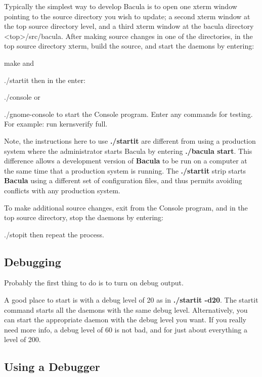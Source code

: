 Typically the simplest way to develop Bacula is to open one xterm window
pointing to the source directory you wish to update; a second xterm window at
the top source directory level, and a third xterm window at the bacula
directory {\textless}top{\textgreater}/src/bacula. After making source changes in one of the
directories, in the top source directory xterm, build the source, and start
the daemons by entering:

make and

./startit then in the enter:

./console or

./gnome-console to start the Console program. Enter any commands for testing.
For example: run kernsverify full.

Note, the instructions here to use {\bf ./startit} are different from using a
production system where the administrator starts Bacula by entering {\bf
./bacula start}. This difference allows a development version of {\bf Bacula}
to be run on a computer at the same time that a production system is running.
The {\bf ./startit} strip starts {\bf Bacula} using a different set of
configuration files, and thus permits avoiding conflicts with any production
system.

To make additional source changes, exit from the Console program, and in the
top source directory, stop the daemons by entering:

./stopit then repeat the process.

\subsection{Debugging}

Probably the first thing to do is to turn on debug output.

A good place to start is with a debug level of 20 as in {\bf ./startit -d20}.
The startit command starts all the daemons with the same debug level.
Alternatively, you can start the appropriate daemon with the debug level you
want. If you really need more info, a debug level of 60 is not bad, and for
just about everything a level of 200.

\subsection{Using a Debugger}

